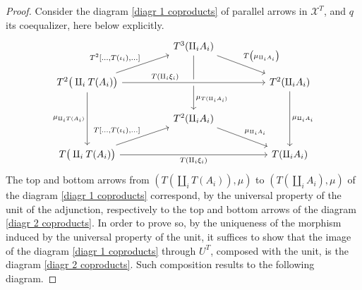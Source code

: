 \begin{subbox}{}
    \begin{proof}
        Consider the diagram \eqref{diagr 1 coproducts} of parallel arrows in $\mathcal{X}^T$, and $q$ its coequalizer, here below explicitly.
        \[
\begin{tikzcd}
                                                                                                                                          &  & T^3(\amalg_iA_i) \arrow[dd, "\mu_{T(\amalg_iA_i)}", pos=0.8] \arrow[rrd, "T\big(\mu_{\amalg_iA_i}\big)"] &  &                                              \\
T^2\big(\amalg_iT(A_i)\big) \arrow[dd, "\mu_{\amalg_iT(A_i)}"'] \arrow[rru, "{T^2[\ldots,T(\iota_i),\ldots]}"] \arrow[rrrr, "T(\amalg_i\xi_i)", pos=0.3, crossing over] &  &                                                                                   &  & T^2(\amalg_iA_i) \arrow[dd, "\mu_{\amalg_iA_i}"] \\
                                                                                                                                          &  & T^2(\amalg_iA_i) \arrow[rrd, "\mu_{\amalg_iA_i}"]                                     &  &                                              \\
T\big(\amalg_iT(A_i)\big) \arrow[rrrr, "T(\amalg_i\xi_i)"'] \arrow[rru, "{T[\ldots,T(\iota_i),\ldots]}"]                                      &  &                                                                                   &  & T(\amalg_iA_i)                                
\end{tikzcd}
\]
The top and bottom arrows from $(T(\amalg_iT(A_i)),\mu)$ to $(T(\amalg_iA_i),\mu)$ of the diagram \eqref{diagr 1 coproducts} correspond, by the universal property of the unit of the adjunction, respectively to the top and bottom arrows of the diagram \eqref{diagr 2 coproducts}. In order to prove so, by the uniqueness of the morphism induced by the universal property of the unit, it suffices to show that the image of the diagram \eqref{diagr 1 coproducts} through $U^T$, composed with the unit, is the diagram \eqref{diagr 2 coproducts}. Such composition results to the following diagram.

\end{proof}
\end{subbox}
